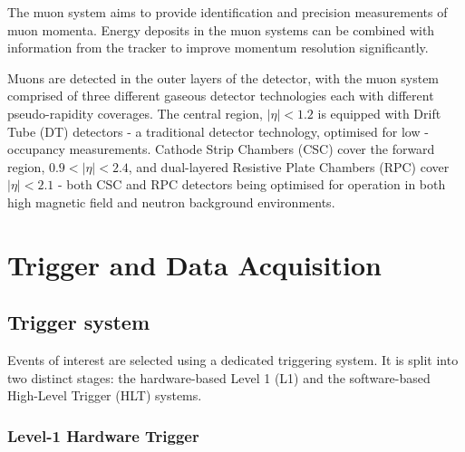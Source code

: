 The muon system aims to provide identification and precision measurements of
muon momenta. Energy deposits in the muon systems can be combined with 
information from the tracker to improve momentum resolution significantly.

Muons are detected in the outer layers of the detector, with the muon system 
comprised of three different gaseous detector technologies each with different 
pseudo-rapidity coverages. The central region, $|\eta|<1.2$ is equipped with 
Drift Tube (DT) detectors - a traditional detector technology, optimised for low
-occupancy measurements. Cathode Strip Chambers (CSC) cover the forward region,
$0.9 < |\eta| < 2.4$, and dual-layered Resistive Plate Chambers (RPC) cover
$|\eta| < 2.1$ - both CSC and RPC detectors being optimised for operation in 
both high magnetic field and neutron background environments.

\section{Trigger and Data Acquisition}  %
\label{sec:detector_trigger}

\subsection{Trigger system}
Events of interest are selected using a dedicated triggering system. It is 
split into two distinct stages: the hardware-based Level 1 (L1) and
the software-based High-Level Trigger (HLT) systems.

\subsubsection{Level-1 Hardware Trigger}

